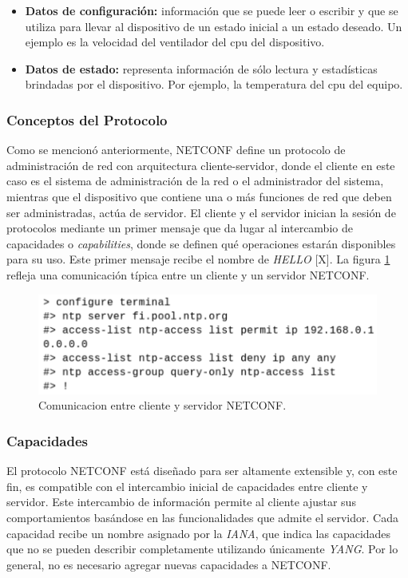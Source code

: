 \begin{itemize}
	\item \textbf{Datos de configuración:} información que se puede leer o escribir y que se utiliza para llevar al dispositivo de un estado inicial a un estado deseado. Un ejemplo es la velocidad del ventilador del cpu del dispositivo.  
	\item \textbf{Datos de estado:} representa información de sólo lectura y estadísticas brindadas por el dispositivo. Por ejemplo, la temperatura del cpu del equipo.   
\end{itemize}

\subsubsection{Conceptos del Protocolo}
Como se mencionó anteriormente, NETCONF define un protocolo de administración de red con arquitectura cliente-servidor, donde el cliente en este caso es el sistema de administración de la red o el administrador del sistema, mientras que el dispositivo que contiene una o más funciones de red que deben ser administradas, actúa de servidor. El cliente y el servidor inician la sesión de protocolos mediante un primer mensaje que da lugar al intercambio de capacidades o \textit{capabilities}, donde se definen qué operaciones estarán disponibles para su uso. Este primer mensaje recibe el nombre de \textit{HELLO} [X]. La figura \ref{fig:netconf_comunicacion} refleja una comunicación típica entre un cliente y un servidor NETCONF.

\begin{figure}[htbp]
	\centering
	\includegraphics[scale=0.6]{Figures/cli.pdf}
	\caption{Comunicacion entre cliente y servidor NETCONF.}
	\label{fig:netconf_comunicacion}
  \end{figure}

  \subsubsection{Capacidades}
  El protocolo NETCONF está diseñado para ser altamente extensible y, con este fin, es compatible con el intercambio inicial de capacidades entre cliente y servidor. Este intercambio de información permite al cliente ajustar sus comportamientos basándose en las funcionalidades que admite el servidor. Cada capacidad recibe un nombre asignado por la \textit{IANA}, que indica las capacidades que no se pueden describir completamente utilizando únicamente \textit{YANG}. Por lo general, no es necesario agregar nuevas capacidades a NETCONF. 

